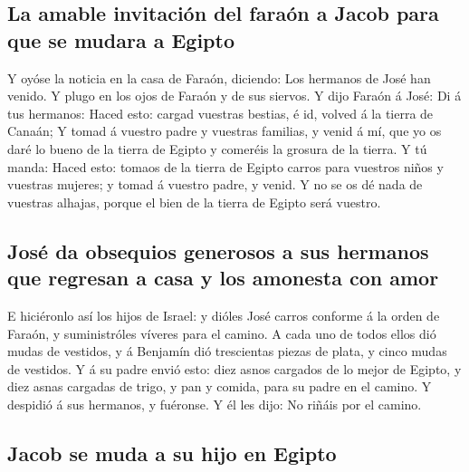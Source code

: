 \hypertarget{la-amable-invitaciuxf3n-del-farauxf3n-a-jacob-para-que-se-mudara-a-egipto}{%
\subsection{La amable invitación del faraón a Jacob para que se mudara a
Egipto}\label{la-amable-invitaciuxf3n-del-farauxf3n-a-jacob-para-que-se-mudara-a-egipto}}

 Y oyóse la noticia en la casa de Faraón, diciendo: Los
hermanos de José han venido. Y plugo en los ojos de Faraón y de sus
siervos.  Y dijo Faraón á José: Di á tus hermanos: Haced
esto: cargad vuestras bestias, é id, volved á la tierra de Canaán;
 Y tomad á vuestro padre y vuestras familias, y venid á
mí, que yo os daré lo bueno de la tierra de Egipto y comeréis la grosura
de la tierra.  Y tú manda: Haced esto: tomaos de la
tierra de Egipto carros para vuestros niños y vuestras mujeres; y tomad
á vuestro padre, y venid.  Y no se os dé nada de vuestras
alhajas, porque el bien de la tierra de Egipto será vuestro.

\hypertarget{josuxe9-da-obsequios-generosos-a-sus-hermanos-que-regresan-a-casa-y-los-amonesta-con-amor}{%
\subsection{José da obsequios generosos a sus hermanos que regresan a
casa y los amonesta con
amor}\label{josuxe9-da-obsequios-generosos-a-sus-hermanos-que-regresan-a-casa-y-los-amonesta-con-amor}}

 E hiciéronlo así los hijos de Israel: y dióles José
carros conforme á la orden de Faraón, y suministróles víveres para el
camino.  A cada uno de todos ellos dió mudas de vestidos,
y á Benjamín dió trescientas piezas de plata, y cinco mudas de vestidos.
 Y á su padre envió esto: diez asnos cargados de lo mejor
de Egipto, y diez asnas cargadas de trigo, y pan y comida, para su padre
en el camino.  Y despidió á sus hermanos, y fuéronse. Y
él les dijo: No riñáis por el camino.

\hypertarget{jacob-se-muda-a-su-hijo-en-egipto}{%
\subsection{Jacob se muda a su hijo en
Egipto}\label{jacob-se-muda-a-su-hijo-en-egipto}}

